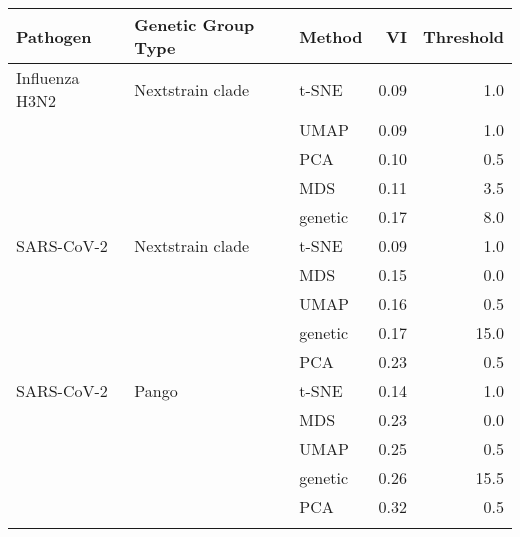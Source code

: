 \begin{tabular}{lllrr}
\toprule
      Pathogen & Genetic Group Type &  Method &   VI &  Threshold \\
\midrule
Influenza H3N2 &   Nextstrain clade &   t-SNE & 0.09 &        1.0 \\
               &                    &    UMAP & 0.09 &        1.0 \\
               &                    &     PCA & 0.10 &        0.5 \\
               &                    &     MDS & 0.11 &        3.5 \\
               &                    & genetic & 0.17 &        8.0 \\
    SARS-CoV-2 &   Nextstrain clade &   t-SNE & 0.09 &        1.0 \\
               &                    &     MDS & 0.15 &        0.0 \\
               &                    &    UMAP & 0.16 &        0.5 \\
               &                    & genetic & 0.17 &       15.0 \\
               &                    &     PCA & 0.23 &        0.5 \\
    SARS-CoV-2 &              Pango &   t-SNE & 0.14 &        1.0 \\
               &                    &     MDS & 0.23 &        0.0 \\
               &                    &    UMAP & 0.25 &        0.5 \\
               &                    & genetic & 0.26 &       15.5 \\
               &                    &     PCA & 0.32 &        0.5 \\
\botrule
\end{tabular}
